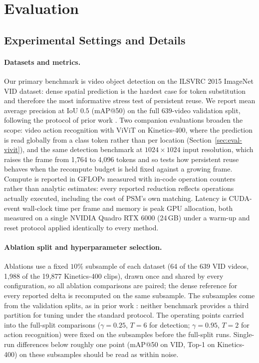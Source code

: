 \section{Evaluation}
\label{sec:eval}

\subsection{Experimental Settings and Details}
\label{sec:setup}

\paragraph{Datasets and metrics.}
Our primary benchmark is video object detection on the ILSVRC 2015
ImageNet VID dataset: dense spatial prediction is the hardest case for
token substitution and therefore the most informative stress test of
persistent reuse. We report mean average precision at IoU $0.5$ (mAP@50)
on the full 639-video validation split, following the protocol of prior
work \cite{eventful,maskvd}. Two companion evaluations broaden the
scope: video action recognition with ViViT on Kinetics-400, where the
prediction is read globally from a class token rather than per location
(Section~\ref{sec:eval-vivit}), and the same detection benchmark at
$1024 \times 1024$ input resolution, which raises the frame from 1{,}764
to 4{,}096 tokens and so tests how persistent reuse behaves when the
recompute budget is held fixed against a growing frame. Compute
is reported in GFLOPs measured with in-code operation counters rather
than analytic estimates: every reported reduction reflects operations
actually executed, including the cost of PSM's own matching. Latency is
CUDA-event wall-clock time per frame and memory is peak GPU allocation,
both measured on a single NVIDIA Quadro RTX 6000 (24\,GB) under a
warm-up and reset protocol applied identically to every method.

\paragraph{Ablation split and hyperparameter selection.}
Ablations use a fixed $10\%$ subsample of each dataset (64 of the 639
VID videos, 1{,}988 of the 19{,}877 Kinetics-400 clips), drawn once and
shared by every configuration, so all ablation comparisons are paired;
the dense reference for every reported delta is recomputed on the same
subsample. The subsamples come from the validation splits, as in prior
work \cite{eventful,maskvd}: neither benchmark provides a third
partition for tuning under the standard protocol. The operating points
carried into the full-split comparisons ($\gamma = 0.25$, $T = 6$ for
detection; $\gamma = 0.95$, $T = 2$ for action recognition) were fixed
on the subsamples before the full-split runs. Single-run differences below roughly one
point (mAP@50 on VID, Top-1 on Kinetics-400) on these subsamples should
be read as within noise.

